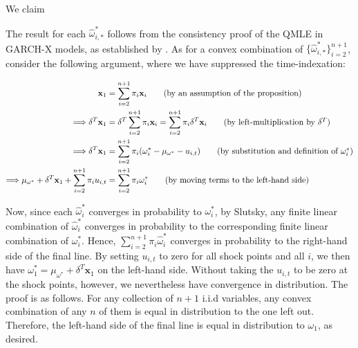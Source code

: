 \documentclass[11pt]{article}
\newcommand{\weight}{\pi}
\newcommand{\x}{\textbf{x}}
\theoremstyle{definition}
\newenvironment{proof-of-proposition}[1][{}]{\noindent{\bf
    Proof of Proposition {#1}}
  \hspace*{.5em}}{\qed\bigskip\\}
\begin{document}
\begin{proof-of-proposition}[\ref{ARIMA_param_consistency}]
  We claim

  The result for each $\hat\omega^{*}_{i,*}$ follows from the consistency proof of the QMLE in GARCH-X models, as established by \citet{han2014asymptotic}.  As for a convex combination of $\{\hat\omega^{*}_{i,*}\}_{i=2}^{n+1}$, consider the following argument, where we have suppressed the time-indexation:
    
  \begin{align}
  \x_{1} &= \sum^{n+1}_{i=2}\weight_{i}\x_{i} \tag{by an assumption of the proposition}\\
 \Longrightarrow \delta^{T}\x_{1} &= \delta^{T}\sum^{n+1}_{i=2}\weight_{i}\x_{i}  = \sum^{n+1}_{i=2}\weight_{i}\delta^{T}\x_{i}\tag{by left-multiplication by $\delta^{T}$}\\
  \Longrightarrow\delta^{T}\x_{1} &=\sum^{n+1}_{i=2}\pi_{i}(\omega_{i}^{*} - \mu_{\omega^{*}} - u_{i,t})\tag{by substitution and definition of $\omega^{*}_{i}$}\\
  \Longrightarrow\mu_{\omega^{*}} + \delta^{T}\x_{1} + \sum^{n+1}_{i=2}\pi_{i}u_{i,t} &= \sum^{n+1}_{i=2}\pi_{i}\omega_{i}^{*} \tag{by moving  terms to the left-hand side}
  \end{align}

Now, since each $\hat\omega^{*}_{i}$ converges in probability to $\omega^{*}_{i}$, by Slutsky, any finite linear combination of $\hat\omega^{*}_{i}$ converges in probability to the corresponding finite linear combination of $\omega^{*}_{i}$.  Hence, $\sum^{n+1}_{i=2}\pi_{i}\hat\omega_{i}^{*}$ converges in probability to the right-hand side of the final line.  By setting $u_{i,t}$ to zero for all shock points and all $i$, we then have $\omega_{1}^{*} = \mu_{\omega^{*}} + \delta^{T}\x_{1} $ on the left-hand side.  Without taking the $u_{i,t}$ to be zero at the shock points, however, we nevertheless have convergence in distribution.  The proof is as follows.  For any collection of $n+1$ i.i.d variables, any convex combination of any $n$ of them is equal in distribution to the one left out.  Therefore, the left-hand side of the final line is equal in distribution to $\omega_{1}$, as desired.
  
  \end{proof-of-proposition}
\end{document}
